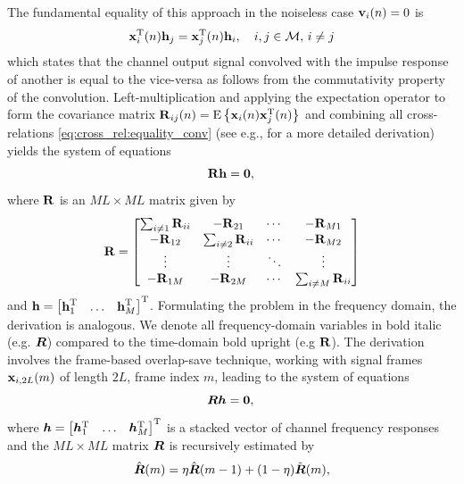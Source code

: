 \documentclass{article}
\begin{document}
The fundamental equality of this approach in the noiseless case \(\bm{\mathrm{v}}_i(n) = 0\) is 
\begin{equation}
    \bm{\mathrm{x}}_i^{{\mathrm{T}}}(n) \bm{\mathrm{h}}_j = \bm{\mathrm{x}}_j^{{\mathrm{T}}}(n) \bm{\mathrm{h}}_i,\quad i,j \in \mathcal{M},\,i\neq j\label{eq:cross_rel:equality_conv}
\end{equation}
which states that the channel output signal convolved with the impulse response of another is equal to the vice-versa as follows from the commutativity property of the convolution.
Left-multiplication and applying the expectation operator to form the covariance matrix \(\bm{\mathrm{R}}_{ij}(n) = \mathrm{E} \left\lbrace \bm{\mathrm{x}}_i(n) \bm{\mathrm{x}}_j^{\mathrm{T}}(n) \right\rbrace\) and combining all cross-relations \eqref{eq:cross_rel:equality_conv} (see e.g., \cite{huangAdaptiveMultichannelLeast2002} for a more detailed derivation) yields the system of equations  
\begin{equation}
    \bm{\mathrm{R}} \bm{\mathrm{h}} = \bm{0}, \label{eq:cross_rel:null_space}\\
\end{equation}
where \(\bm{\mathrm{R}}\) is an \(M L \times M L\) matrix given by
\begin{equation}
    \bm{\mathrm{R}} = \begin{bmatrix}
        \sum_{i \neq 1} \bm{\mathrm{R}}_{ii} & -\bm{\mathrm{R}}_{21} & \cdots & -\bm{\mathrm{R}}_{M1}\\
        -\bm{\mathrm{R}}_{12} & \sum_{i \neq 2} \bm{\mathrm{R}}_{ii} & \cdots & -\bm{\mathrm{R}}_{M2}\\
        \vdots & \vdots & \ddots & \vdots\\
        -\bm{\mathrm{R}}_{1M} & -\bm{\mathrm{R}}_{2M} & \cdots & \sum_{i \neq M} \bm{\mathrm{R}}_{ii}\\
    \end{bmatrix}\label{eq:cross_rel:data_matrix}
\end{equation}
and \(\bm{\mathrm{h}} = \begin{bmatrix}
    \bm{\mathrm{h}}_1^{\mathrm{T}} & \ldots & \bm{\mathrm{h}}_M^{\mathrm{T}}
\end{bmatrix}^{\mathrm{T}}\).
Formulating the problem in the frequency domain, the derivation is analogous. We denote all frequency-domain variables in bold italic (e.g. \({\bm{{R}}}\)) compared to the time-domain bold upright (e.g \(\bm{\mathrm{R}}\)). The derivation involves the frame-based overlap-save technique, working with signal frames \(\bm{\mathrm{x}}_{i,2L}(m)\) of length \(2L\), frame index \(m\), leading to the system of equations 
\begin{equation}
    {\bm{{R}}} {\bm{h}} = \bm{0}, \label{eq:frequency_domain:null_space}\\
\end{equation}
where \({\bm{h}} = \begin{bmatrix}
    {\bm{h}}_1^{\mathrm{T}} & \ldots & {\bm{h}}_M^{\mathrm{T}}
\end{bmatrix}^{\mathrm{T}} \) is a stacked vector of channel frequency responses and the \(M L \times M L\) matrix \({\bm{{R}}}\) is recursively estimated by \begin{equation}
    \hat{{\bm{{R}}}}(m) = \eta \hat{{\bm{{R}}}}(m-1) + (1-\eta )\tilde{{\bm{{R}}}}(m),
\end{equation}
\end{document}
